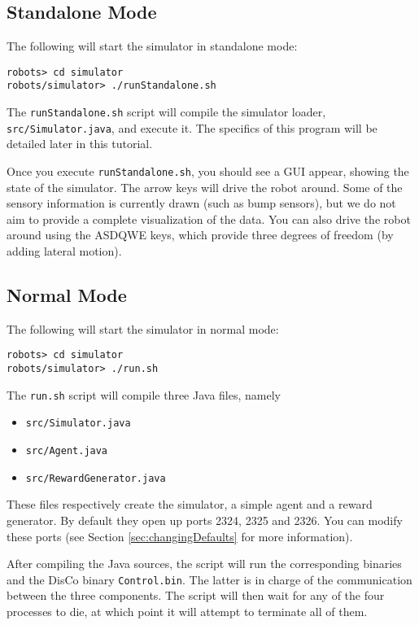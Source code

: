 \documentclass[12pt]{article}
\begin{document}
\subsection{Standalone Mode}\label{subsec:standalone}

The following will start the simulator in standalone mode:

\begin{verbatim}
robots> cd simulator 
robots/simulator> ./runStandalone.sh
\end{verbatim}

The \verb+runStandalone.sh+ script will compile the simulator loader,
\verb+src/Simulator.java+, and execute it. The specifics of this program will 
be detailed later in this tutorial.

Once you execute \verb+runStandalone.sh+, you should see a GUI appear, showing
the state of the simulator. The arrow keys will drive the robot around. Some 
of the
sensory information is currently drawn (such as bump sensors), but we do not
aim to provide a complete visualization of the data. You can also drive the
robot around using the ASDQWE keys, which provide three degrees of freedom
(by adding lateral motion).

\subsection{Normal Mode}

The following will start the simulator in normal mode:

\begin{verbatim}
robots> cd simulator 
robots/simulator> ./run.sh
\end{verbatim}

The \verb+run.sh+ script will compile three Java files, namely

\begin{itemize}
\item{\verb+src/Simulator.java+}
\item{\verb+src/Agent.java+}
\item{\verb+src/RewardGenerator.java+}
\end{itemize}

These files respectively create the simulator, a simple agent and a reward
generator. By default they open up ports 2324, 2325 and 2326. You can modify
these ports (see Section \ref{sec:changingDefaults} for more information).

After compiling the Java sources, the script will run the corresponding
binaries and the DisCo binary \verb+Control.bin+. The latter is in charge
of the communication between the three components. The script will then wait
for any of the four processes to die, at which point it will attempt to 
terminate all of them.
\end{document}
